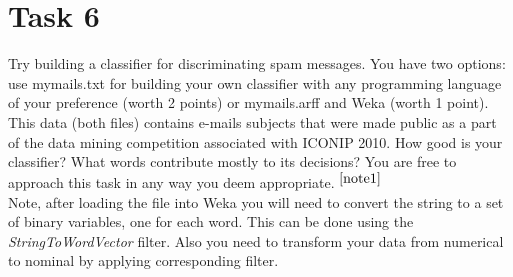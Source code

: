 \documentclass{article}
\newcommand{\footref}[1]{%
    $^{\ref{#1}}$%
}
\begin{document}
\section*{Task 6}
Try building a classifier for discriminating spam messages. You have two options: use my\textunderscore mails.txt for building your own classifier with any programming language of your preference (worth 2 points) or my\textunderscore mails.arff and Weka (worth 1 point). This data (both files) contains e-mails subjects that were made public as a part of the data mining competition associated with ICONIP 2010. How good is your classifier? What words contribute mostly to its decisions? You are free to approach this task in any way you deem appropriate.\footref{note1}\\

Note, after loading the file into Weka you will need to convert the string to a set of binary variables, one for each word. This can be done using the \emph{StringToWordVector} filter. Also you need to transform your data from numerical to nominal by applying corresponding filter. 
\end{document}
